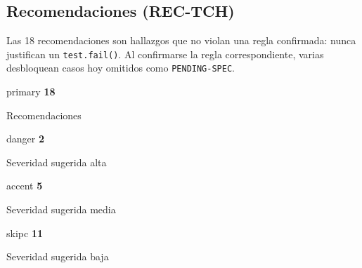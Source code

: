 \documentclass[11pt,a4paper]{article}
\newcommand{\code}[1]{\texttt{#1}}
\newcommand{\kpi}[3]{\begin{kpibox}{#3}%
  {\fontsize{21}{24}\selectfont\bfseries\color{#3}#1}\par\vspace{1pt}%
  {\footnotesize\color{muted}#2}\end{kpibox}}
\begin{document}
\subsection{Recomendaciones (REC-TCH)}

Las 18 recomendaciones son hallazgos que no violan una regla confirmada: nunca justifican un \code{test.fail()}. Al confirmarse la regla correspondiente, varias desbloquean casos hoy omitidos como \code{PENDING-SPEC}.

\begin{tcbraster}[raster columns=4, raster equal height, raster column skip=6pt, raster before skip=8pt, raster after skip=8pt]
\kpi{18}{Recomendaciones}{primary}
\kpi{2}{Severidad sugerida alta}{danger}
\kpi{5}{Severidad sugerida media}{accent}
\kpi{11}{Severidad sugerida baja}{skipc}
\end{tcbraster}
\end{document}
